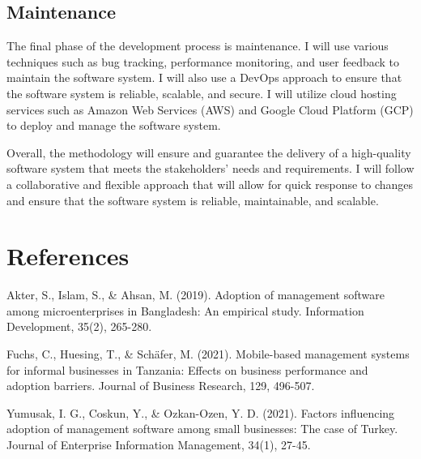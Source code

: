 \documentclass{article}
\begin{document}
\subsection{Maintenance}

The final phase of the development process is maintenance. I will use various techniques such as bug tracking, performance monitoring, and user feedback to maintain the software system. I will also use a DevOps approach to ensure that the software system is reliable, scalable, and secure. I will utilize cloud hosting services such as Amazon Web Services (AWS) and Google Cloud Platform (GCP) to deploy and manage the software system.

Overall, the methodology will ensure and guarantee the delivery of a high-quality software system that meets the stakeholders' needs and requirements. I will follow a collaborative and flexible approach that will allow for quick response to changes and ensure that the software system is reliable, maintainable, and scalable.

\newpage


\section{References}
\renewcommand{\refname}{}
\begin{thebibliography}{10}
	
	Akter, S., Islam, S., \& Ahsan, M. (2019). Adoption of management software among microenterprises in Bangladesh: An empirical study. Information Development, 35(2), 265-280.

	Fuchs, C., Huesing, T., \& Schäfer, M. (2021). Mobile-based management systems for informal businesses in Tanzania: Effects on business performance and adoption barriers. Journal of Business Research, 129, 496-507.

	Yumusak, I. G., Coskun, Y., \& Ozkan-Ozen, Y. D. (2021). Factors influencing adoption of management software among small businesses: The case of Turkey. Journal of Enterprise Information Management, 34(1), 27-45.

\end{thebibliography}
\end{document}
